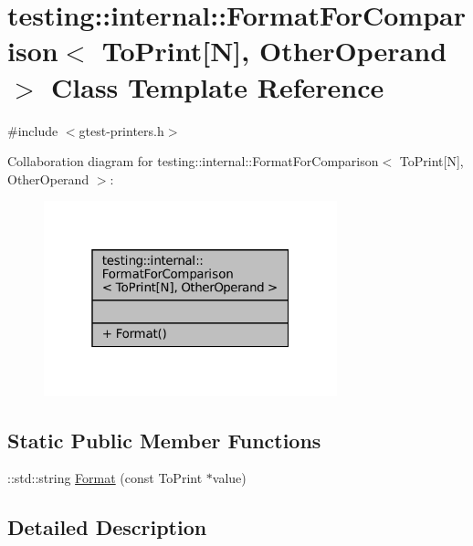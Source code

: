 \hypertarget{classtesting_1_1internal_1_1FormatForComparison_3_01ToPrint[N]_00_01OtherOperand_01_4}{}\section{testing\+:\+:internal\+:\+:Format\+For\+Comparison$<$ To\+Print\mbox{[}N\mbox{]}, Other\+Operand $>$ Class Template Reference}
\label{classtesting_1_1internal_1_1FormatForComparison_3_01ToPrint[N]_00_01OtherOperand_01_4}


{\ttfamily \#include $<$gtest-\/printers.\+h$>$}



Collaboration diagram for testing\+:\+:internal\+:\+:Format\+For\+Comparison$<$ To\+Print\mbox{[}N\mbox{]}, Other\+Operand $>$\+:
\nopagebreak
\begin{figure}[H]
\begin{center}
\leavevmode
\includegraphics[width=241pt]{classtesting_1_1internal_1_1FormatForComparison_3_01ToPrint[N]_00_01OtherOperand_01_4__coll__graph}
\end{center}
\end{figure}
\subsection*{Static Public Member Functions}
\begin{DoxyCompactItemize}
\item 
\+::std\+::string \hyperlink{classtesting_1_1internal_1_1FormatForComparison_3_01ToPrint[N]_00_01OtherOperand_01_4_a76c526461c8fa7df75f7b32ab889b9e0}{Format} (const To\+Print $\ast$value)
\end{DoxyCompactItemize}


\subsection{Detailed Description}

